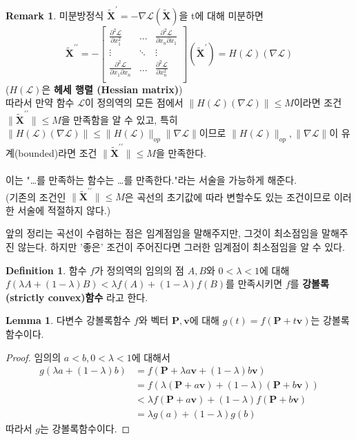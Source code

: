 \documentclass[a4paper,20pt]{article}
\theoremstyle{definition}
\newtheorem{definition}{Definition}[section]
\newtheorem{lemma}[theorem]{Lemma}
\newtheorem*{remark}{Remark}
\newcommand{\curve}[1][X]{\tilde{\mathbf{#1}}}
\begin{document}
\begin{remark}
미분방정식 $\curve^{\prime}=-\nabla\mathcal{L}(\curve)$을 t에 대해 미분하면
$$
\curve^{\prime \prime}= -\left[ 
	\begin{array}{ccc}
	\frac{\partial^{2}\mathcal{L}}{\partial x_{1}^{2}} & \ldots & \frac{\partial^{2}\mathcal{L}}{\partial x_{n} \partial x_{1}} \\
	\vdots & \ddots & \vdots \\
	\frac{\partial^{2}\mathcal{L}}{\partial x_{1} \partial x_{n}} & \ldots & \frac{\partial^{2}\mathcal{L}}{\partial x_{n}^{2}} \\
	\end{array}
\right] (\curve^{\prime})
=H(\mathcal{L})(\nabla\mathcal{L})
$$
($H(\mathcal{L})$은 \textbf{헤세 행렬 (Hessian matrix)}) \\
따라서 만약 함수 $\mathcal{L}$이 정의역의 모든 점에서 $\|H(\mathcal{L})(\nabla\mathcal{L})\|\leq M$이라면 조건 $\|\curve^{\prime \prime}\|\leq M$을 만족함을 알 수 있고, 특히 $\|H(\mathcal{L})(\nabla\mathcal{L})\|\leq \|H(\mathcal{L})\|_{op}\|\nabla\mathcal{L}\|$이므로 $\|H(\mathcal{L})\|_{op}, \|\nabla\mathcal{L}\|$이 유계(bounded)라면 조건 $\|\curve^{\prime \prime}\|\leq M$을 만족한다.
\\\\
이는 "\ldots 를 만족하는 함수는 \ldots 를 만족한다."라는 서술을 가능하게 해준다. \\
(기존의 조건인 $\|\curve^{\prime \prime}\|\leq M$은 곡선의 초기값에 따라 변할수도 있는 조건이므로 이러한 서술에 적절하지 않다.)

\end{remark}


앞의 정리는 곡선이 수렴하는 점은 임계점임을 말해주지만, 그것이 최소점임을 말해주진 않는다. 	하지만 '좋은' 조건이 주어진다면 그러한 임계점이 최소점임을 알 수 있다.

\newpage
\begin{definition}
함수 $f$가 정의역의 임의의 점 $A,B$와 $0< \lambda < 1$에 대해 \\ $f(\lambda A + (1-\lambda) B) < \lambda f(A) + (1-\lambda) f(B)$를 만족시키면 $f$를 \textbf{강볼록(strictly convex)함수} 라고 한다.
\end{definition}

\begin{lemma}
다변수 강볼록함수 $f$와 벡터 $\mathbf{P},\mathbf{v}$에 대해 $g(t)=f(\mathbf{P}+t\mathbf{v})$는 강볼록함수이다.
\end{lemma}
\begin{proof}
임의의 $a<b, 0<\lambda< 1$에 대해서 
\begin{align*}
g(\lambda a+(1-\lambda) b)&=f(\mathbf{P}+\lambda a\mathbf{v}+(1-\lambda) b\mathbf{v})\\&=f(\lambda(\mathbf{P}+a\mathbf{v})+(1-\lambda)(\mathbf{P}+b\mathbf{v}))\\&<\lambda f(\mathbf{P}+a\mathbf{v})+(1-\lambda)f(\mathbf{P}+b\mathbf{v})\\&=\lambda g(a)+(1-\lambda) g(b)
\end{align*}
따라서 $g$는 강볼록함수이다.
\end{proof}
\end{document}
